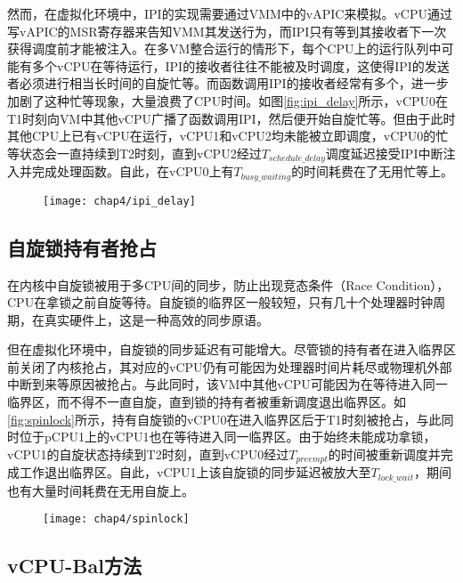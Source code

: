 然而，在虚拟化环境中，IPI的实现需要通过VMM中的vAPIC来模拟。vCPU通过写vAPIC的MSR寄存器来告知VMM其发送行为，而IPI只有等到其接收者下一次获得调度前才能被注入。在多VM整合运行的情形下，每个CPU上的运行队列中可能有多个vCPU在等待运行，IPI的接收者往往不能被及时调度，这使得IPI的发送者必须进行相当长时间的自旋忙等。而函数调用IPI的接收者经常有多个，进一步加剧了这种忙等现象，大量浪费了CPU时间。如图\ref{fig:ipi_delay}所示，vCPU0在T1时刻向VM中其他vCPU广播了函数调用IPI，然后便开始自旋忙等。但由于此时其他CPU上已有vCPU在运行，vCPU1和vCPU2均未能被立即调度，vCPU0的忙等状态会一直持续到T2时刻，直到vCPU2经过$T_{schedule\_delay}$调度延迟接受IPI中断注入并完成处理函数。自此，在vCPU0上有$T_{busy\_waiting}$的时间耗费在了无用忙等上。

\begin{figure}[!htbp]
  \centering
  \texttt{[image: chap4/ipi\_delay]}
\end{figure}

\subsection{自旋锁持有者抢占}

在内核中自旋锁被用于多CPU间的同步，防止出现竞态条件（Race Condition），CPU在拿锁之前自旋等待。自旋锁的临界区一般较短，只有几十个处理器时钟周期，在真实硬件上，这是一种高效的同步原语\cite{anderson1990performance}。

但在虚拟化环境中，自旋锁的同步延迟有可能增大。尽管锁的持有者在进入临界区前关闭了内核抢占，其对应的vCPU仍有可能因为处理器时间片耗尽或物理机外部中断到来等原因被抢占。与此同时，该VM中其他vCPU可能因为在等待进入同一临界区，而不得不一直自旋，直到锁的持有者被重新调度退出临界区。如\ref{fig:spinlock}所示，持有自旋锁的vCPU0在进入临界区后于T1时刻被抢占，与此同时位于pCPU1上的vCPU1也在等待进入同一临界区。由于始终未能成功拿锁，vCPU1的自旋状态持续到T2时刻，直到vCPU0经过$T_{preempt}$的时间被重新调度并完成工作退出临界区。自此，vCPU1上该自旋锁的同步延迟被放大至$T_{lock\_wait}$，期间也有大量时间耗费在无用自旋上。

\begin{figure}[!htbp]
  \centering
  \texttt{[image: chap4/spinlock]}
\end{figure}

\subsection{vCPU-Bal方法}

